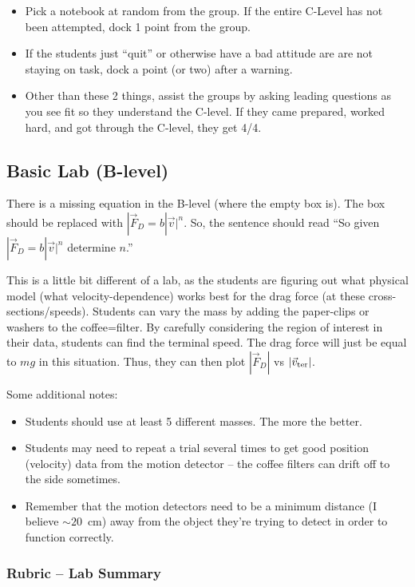 \documentclass[fleqn,letterpaper]{article}
\begin{document}
\begin{itemize}
 \item{Pick a notebook at random from the group.  If the entire C-Level has not been attempted, dock 1 point from the group.}
 \item{If the students just ``quit'' or otherwise have a bad attitude are are not staying on task, dock a point (or two) after a warning.}
 \item{Other than these 2 things, assist the groups by asking leading questions as you see fit so they understand the C-level.  If they came prepared, worked hard, and got through the C-level, they get 4/4.}
\end{itemize}


\subsection*{Basic Lab (B-level)}

There is a missing equation in the B-level (where the empty box is).  The box should be replaced with $|\vec{F}_D = b |\vec{v}|^n$.  So, the sentence should read ``So given $|\vec{F}_D = b |\vec{v}|^n$ determine $n$.''

This is a little bit different of a lab, as the students are figuring out what physical model (what velocity-dependence) works best for the drag force (at these cross-sections/speeds).  Students can vary the mass by adding the paper-clips or washers to the coffee=filter.  By carefully considering the region of interest in their data, students can find the terminal speed.  The drag force will just be equal to $mg$ in this situation.  Thus, they can then plot $|\vec{F}_D|$ vs $|\vec{v}_{\rm ter}|$.

Some additional notes:

\begin{itemize}
\item{Students should use at least 5 different masses.  The more the better.}
\item{Students may need to repeat a trial several times to get good position (velocity) data from the motion detector -- the coffee filters can drift off to the side sometimes.}
\item{Remember that the motion detectors need to be a minimum distance (I believe $\sim 20$~cm) away from the object they're trying to detect in order to function correctly.}
\end{itemize}

\subsubsection*{Rubric -- Lab Summary}
\end{document}
